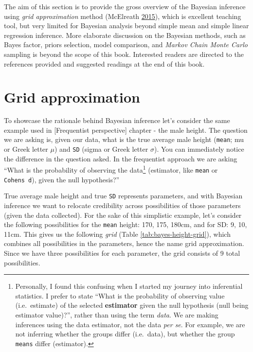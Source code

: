 \documentclass[
]{book}
\begin{document}
The aim of this section is to provide the gross overview of the Bayesian inference using \emph{grid approximation} method (McElreath \protect\hyperlink{ref-mcelreathStatisticalRethinkingBayesian2015}{2015}), which is excellent teaching tool, but very limited for Bayesian analysis beyond simple mean and simple linear regression inference. More elaborate discussion on the Bayesian methods, such as Bayes factor, priors selection, model comparison, and \emph{Markov Chain Monte Carlo} sampling is beyond the scope of this book. Interested readers are directed to the references provided and suggested readings at the end of this book.

\hypertarget{grid-approximation}{%
\section{Grid approximation}\label{grid-approximation}}

To showcase the rationale behind Bayesian inference let's consider the same example used in {[}Frequentist perspective{]} chapter - the male height. The question we are asking is, given our data, what is the true average male height (\texttt{mean}; mu or Greek letter \(\mu\)) and \texttt{SD} (sigma or Greek letter \(\sigma\)). You can immediately notice the difference in the question asked. In the frequentist approach we are asking ``What is the probability of observing the data\footnote{Personally, I found this confusing when I started my journey into inferential statistics. I prefer to state ``What is the probability of observing value (i.e.~estimate) of the selected \textbf{estimator} given the null hypothesis (null being estimator value)?'', rather than using the term \emph{data}. We are making inferences using the data estimator, not the data \emph{per se}. For example, we are not inferring whether the groups differ (i.e.~data), but whether the group \texttt{means} differ (estimator).} (estimator, like \texttt{mean} or \texttt{Cohen\textquotesingle{}s\ d}), given the null hypothesis?''

True average male height and true \texttt{SD} represents parameters, and with Bayesian inference we want to relocate credibility across possibilities of those parameters (given the data collected). For the sake of this simplistic example, let's consider the following possibilities for the \texttt{mean} height: 170, 175, 180cm, and for SD: 9, 10, 11cm. This gives us the following \emph{grid} (Table \ref{tab:bayes-height-grid}), which combines all possibilities in the parameters, hence the name grid approximation. Since we have three possibilities for each parameter, the grid consists of 9 total possibilities.
\end{document}
